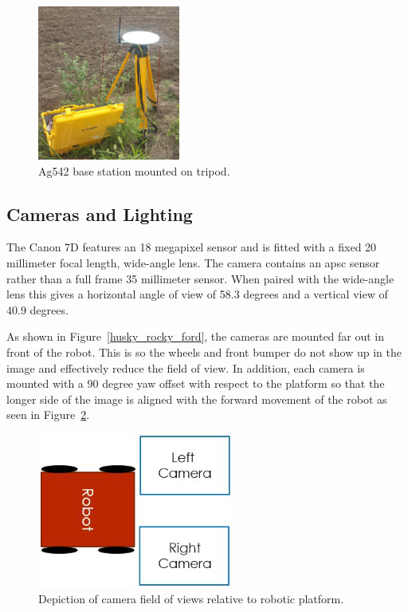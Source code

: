\begin{figure}
	\centering
    \includegraphics[height=2in]{figures/sunflower_base_cropped.jpg}
    \caption[Base station with tripod]{Ag542 base station mounted on tripod.}
    \label{base_station}
\end{figure}

\subsection{Cameras and Lighting}

The Canon 7D features an 18 megapixel sensor and is fitted with a fixed 20 millimeter focal length, wide-angle lens.  The camera contains an \ac{apsc} sensor rather than a full frame 35 millimeter sensor. When paired with the wide-angle lens this gives a horizontal angle of view of 58.3 degrees and a vertical view of 40.9 degrees.
  
As shown in Figure~\ref{husky_rocky_ford}, the cameras are mounted far out in front of the robot.  This is so the wheels and front bumper do not show up in the image and effectively reduce the field of view.  In addition, each camera is mounted with a 90 degree yaw offset with respect to the platform so that the longer side of the image is aligned with the forward movement of the robot as seen in Figure~\ref{figure:image_fov}.  

\begin{figure}
	\centering
    \includegraphics[height=2in]{figures/camera_directions.jpg}
    \caption[Camera field of view]{Depiction of camera field of views relative to robotic platform.}
    \label{figure:image_fov}
\end{figure}

